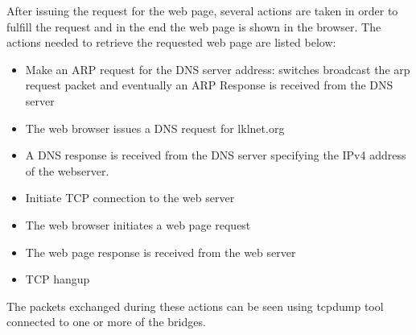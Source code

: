 After issuing the request for the web page, several actions are taken in order to fulfill the request and in the end the web page is shown in the browser.
The actions needed to retrieve the requested web page are listed below:
\begin{itemize}
	\item Make an ARP request for the DNS server address: switches broadcast the arp request packet and eventually an ARP Response is received from the DNS server
	\item The web browser issues a  DNS request for lklnet.org
	\item A DNS response is received from the DNS server specifying the IPv4 address of the webserver.
	\item Initiate TCP connection to the web server
	\item The web browser initiates a web page request
	\item The web page response is received from the web server
	\item TCP hangup
\end{itemize}
The packets exchanged during these actions can be seen using tcpdump tool connected to one or more of the bridges.

